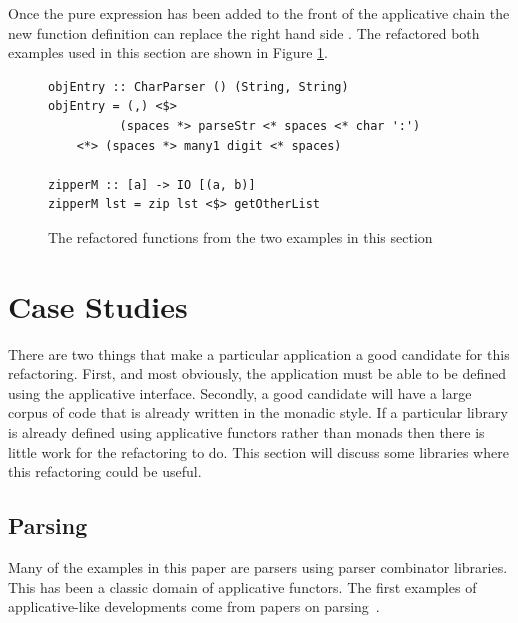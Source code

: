 Once the pure expression has been added to the front of the applicative chain the new function definition can replace the \DIFdelbegin {}\DIFdelend right hand side \DIFaddbegin {}\DIFaddend . The refactored \DIFdelbegin {}\DIFdelend \DIFaddbegin {}\DIFaddend both examples used in this section are shown in Figure \ref{final-fns}.

\begin{figure}[t]
\begin{lstlisting}
objEntry :: CharParser () (String, String)
objEntry = (,) <$> 
		  (spaces *> parseStr <* spaces <* char ':') 
	<*> (spaces *> many1 digit <* spaces)

zipperM :: [a] -> IO [(a, b)]
zipperM lst = zip lst <$> getOtherList
\end{lstlisting}
\caption{The refactored functions from the two examples in this section}
\label{final-fns}
\end{figure}

\section{Case Studies}
\label{sec:appApps}

There are two things that make a particular application a good candidate for this refactoring. First, and most obviously, the application must be able to be defined using the applicative interface. Secondly, a good candidate will have a large corpus of code that is already written in the monadic style. If a particular library is already defined using applicative functors rather than monads then there is little work for the refactoring to do.
This section will discuss some libraries where this refactoring could be useful.

\subsection{Parsing}
Many of the examples in this paper are parsers using parser combinator libraries. This has been a classic domain of applicative functors. The first examples of applicative-like developments come from papers on parsing~\DIFdelbegin {}\DIFdelend \DIFaddbegin {}\DIFaddend .

